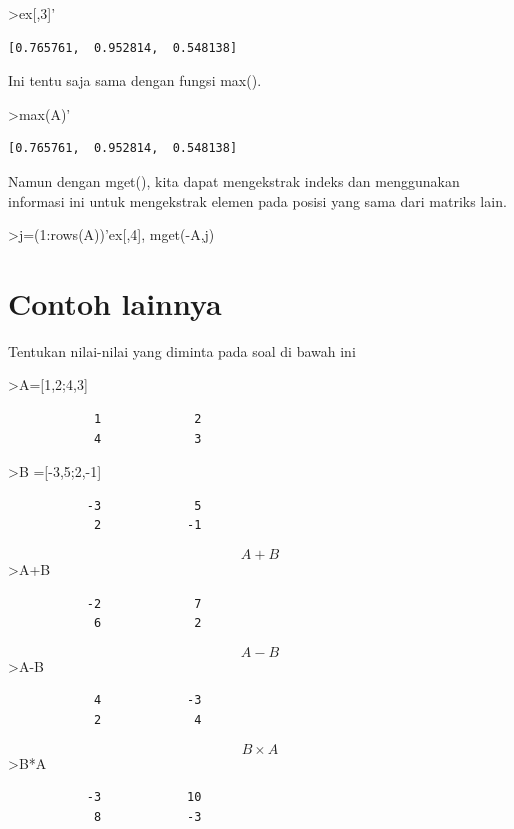 \documentclass[
]{book}
\begin{document}
\textgreater ex{[},3{]}'

\begin{verbatim}
[0.765761,  0.952814,  0.548138]
\end{verbatim}

Ini tentu saja sama dengan fungsi max().

\textgreater max(A)'

\begin{verbatim}
[0.765761,  0.952814,  0.548138]
\end{verbatim}

Namun dengan mget(), kita dapat mengekstrak indeks dan menggunakan informasi ini untuk mengekstrak elemen pada posisi yang sama dari matriks lain.

\textgreater j=(1:rows(A))'\textbar ex{[},4{]}, mget(-A,j)

\chapter{Contoh lainnya}\label{contoh-lainnya-10}

Tentukan nilai-nilai yang diminta pada soal di bawah ini

\textgreater A={[}1,2;4,3{]}

\begin{verbatim}
            1             2 
            4             3 
\end{verbatim}

\textgreater B ={[}-3,5;2,-1{]}

\begin{verbatim}
           -3             5 
            2            -1 
\end{verbatim}

\[A+B\]\textgreater A+B

\begin{verbatim}
           -2             7 
            6             2 
\end{verbatim}

\[A-B\]\textgreater A-B

\begin{verbatim}
            4            -3 
            2             4 
\end{verbatim}

\[B\times A\]\textgreater B*A

\begin{verbatim}
           -3            10 
            8            -3 
\end{verbatim}
\end{document}
